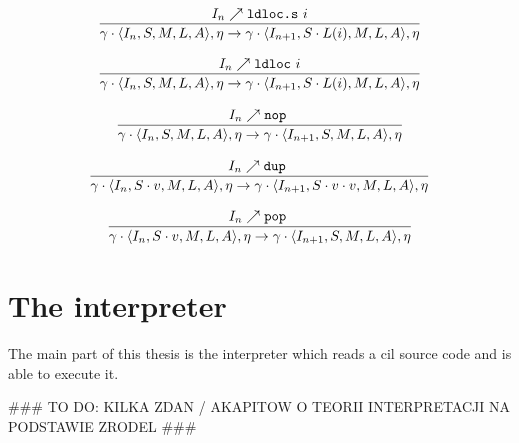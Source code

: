 \documentclass{article}
\numberwithin{equation}{section}
\newcommand{\mstate}[5] {
	\langle#1, #2, #3, #4, #5\rangle
}
\newcommand{\ipointsto}[3] {
	#1 \nearrow \texttt{#2} \text{ } #3
}
\begin{document}
\begin{equation}
\label{eq:semantics_ldlocs}
	\infer{
		\gamma \cdot \mstate{I_n}{S}{M}{L}{A}, \eta
			\rightarrow
		\gamma \cdot \mstate{I_{n+1}}{S \cdot L(i)}{M}{L}{A}, \eta
	}
	{\ipointsto{I_n}{ldloc.s}{i}}
\end{equation}

\begin{equation}
\label{eq:semantics_ldloc}
	\infer{
		\gamma \cdot \mstate{I_n}{S}{M}{L}{A}, \eta
			\rightarrow
		\gamma \cdot \mstate{I_{n+1}}{S \cdot L(i)}{M}{L}{A}, \eta
	}
	{\ipointsto{I_n}{ldloc}{i}}
\end{equation}

\begin{equation}
\label{eq:semantics_nop}
	\infer{
		\gamma \cdot \mstate{I_n}{S}{M}{L}{A}, \eta
			\rightarrow
		\gamma \cdot \mstate{I_{n+1}}{S}{M}{L}{A}, \eta
	}
	{\ipointsto{I_n}{nop}}
\end{equation}

\begin{equation}
\label{eq:semantics_dup}
	\infer{
		\gamma \cdot \mstate{I_n}{S \cdot v}{M}{L}{A}, \eta
			\rightarrow
		\gamma \cdot \mstate{I_{n+1}}{S \cdot v \cdot v}{M}{L}{A}, \eta
	}
	{\ipointsto{I_n}{dup}}
\end{equation}

\begin{equation}
\label{eq:semantics_pop}
	\infer{
		\gamma \cdot \mstate{I_n}{S \cdot v}{M}{L}{A}, \eta
			\rightarrow
		\gamma \cdot \mstate{I_{n+1}}{S}{M}{L}{A}, \eta
	}
	{\ipointsto{I_n}{pop}}
\end{equation}

\clearpage


\section{The interpreter}

The main part of this thesis is the interpreter which reads a \acrshort{cil} source code and is able to execute it.

\#\#\# TO DO: KILKA ZDAN / AKAPITOW O TEORII INTERPRETACJI NA PODSTAWIE ZRODEL \#\#\#
\end{document}
